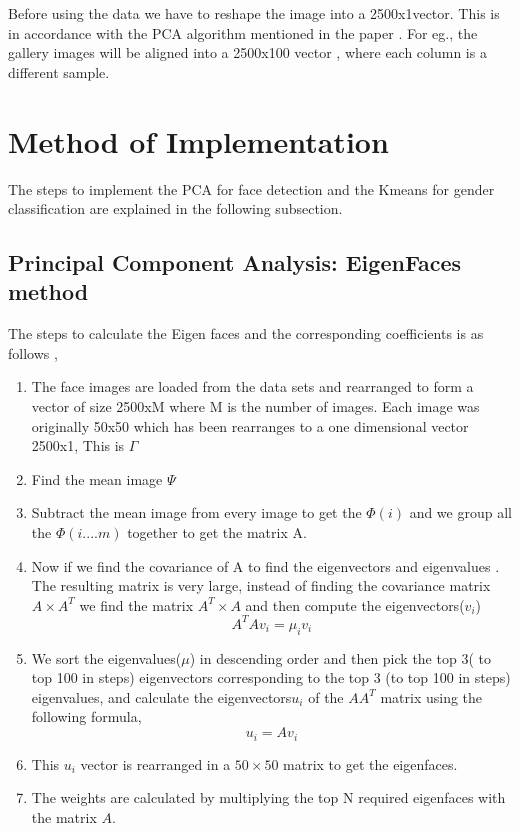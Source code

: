 \documentclass[conference]{IEEEtran}
\begin{document}
Before using the data we have to reshape the image into a 2500x1vector. This is in accordance with the PCA algorithm mentioned in the paper \cite{PcaForFaceFirst}. For eg., the gallery images will be aligned into a 2500x100 vector , where each column is a different sample.


\section{Method of Implementation}
The steps to implement the PCA for face detection and the Kmeans for gender classification are explained in the following subsection. 



\subsection{Principal Component Analysis: EigenFaces method}
The steps to calculate the Eigen faces and the corresponding coefficients is as follows \cite{PcaForFaceFirst},
\begin{enumerate}[label=(\alph*)]
\item The face images are loaded from the data sets and rearranged to form a vector of size 2500xM where M is the number of images. Each image was originally 50x50 which has been rearranges to a one dimensional vector 2500x1, This is $\Gamma$
\item Find the mean image $\Psi$
\item Subtract the mean image from every image to get the $\Phi(i)$ and we group all the $\Phi(i....m)$ together to get the matrix A.
\item Now if we find the covariance of A to find the eigenvectors and eigenvalues . The resulting matrix is very large, instead of finding the covariance matrix $ A \times A^{T} $ we find the matrix $ A^{T}\times A $ and  then compute the eigenvectors($v_{i}$) 
$$
        A^{T}Av_{i} = \mu_{i}v_{i}	
$$
\item We sort the eigenvalues($\mu$) in descending order and then pick the top 3( to top 100 in steps) eigenvectors corresponding to the top 3 (to top 100 in steps) eigenvalues, and calculate the eigenvectors$u_{i}$ of the $AA^{T}$ matrix using the following formula,
$$
u_{i} = Av_{i}
$$
\item This $u_{i}$ vector is rearranged in a $50\times50$ matrix to get the eigenfaces. 
\item The weights are calculated by multiplying the top N required eigenfaces with the matrix $A$.
\end{enumerate}
\end{document}
